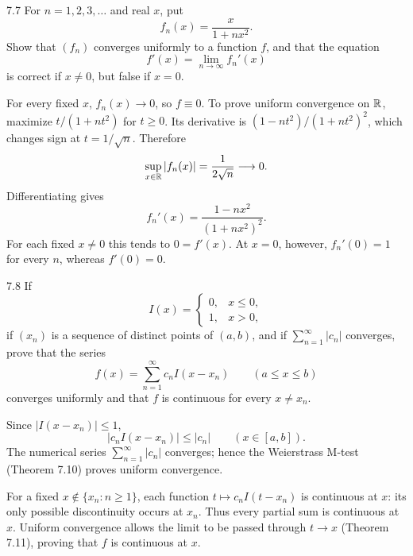 \documentclass[11pt, oneside]{article}
\begin{document}
\begin{exercise}{7.7}
For $n=1, 2, 3, \ldots$ and real $x$, put
\[
 f_n(x)=\frac{x}{1+nx^2}.
\]
Show that $(f_n)$ converges uniformly to a function $f$, and that the equation
\[
 f'(x)=\lim_{n\to\infty}f_n'(x)
\]
is correct if $x\ne0$, but false if $x=0$.
\end{exercise}
\begin{solution}
For every fixed $x$, $f_n(x)\to0$, so $f\equiv0$. To prove uniform convergence on $\mathbb{R}$, maximize $t/(1+nt^2)$ for $t\ge0$. Its derivative is $(1-nt^2)/(1+nt^2)^2$, which changes sign at $t=1/\sqrt n$. Therefore
\[
 \sup_{x\in\mathbb{R}}|f_n(x)|=\frac1{2\sqrt n}\longrightarrow0.
\]
Differentiating gives
\[
 f_n'(x)=\frac{1-nx^2}{(1+nx^2)^2}.
\]
For each fixed $x\ne0$ this tends to $0=f'(x)$. At $x=0$, however, $f_n'(0)=1$ for every $n$, whereas $f'(0)=0$.
\end{solution}

\begin{exercise}{7.8}
If
\[
 I(x)=\begin{cases}0, &x\le0, \\1, &x>0, \end{cases}
\]
if $(x_n)$ is a sequence of distinct points of $(a, b)$, and if $\displaystyle\sum_{n=1}^{\infty}|c_n|$ converges, prove that the series
\[
 f(x)=\sum_{n=1}^{\infty}c_n I(x-x_n)\qquad(a\le x\le b)
\]
converges uniformly and that $f$ is continuous for every $x\ne x_n$.
\end{exercise}
\begin{solution}
Since $|I(x-x_n)|\le1$,
\[
 |c_n I(x-x_n)|\le |c_n|\qquad(x\in[a, b]).
\]
The numerical series $\displaystyle\sum_{n=1}^{\infty}|c_n|$ converges; hence the Weierstrass M-test (Theorem 7.10) proves uniform convergence.

For a fixed $x\notin\{x_n:n\ge1\}$, each function $t\mapsto c_n I(t-x_n)$ is continuous at $x$: its only possible discontinuity occurs at $x_n$. Thus every partial sum is continuous at $x$. Uniform convergence allows the limit to be passed through $t\to x$ (Theorem 7.11), proving that $f$ is continuous at $x$.
\end{solution}
\end{document}
